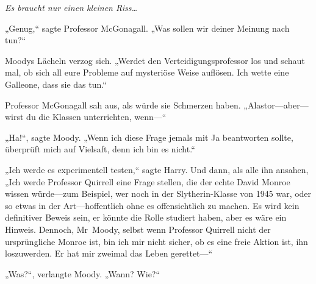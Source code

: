 \emph{Es braucht nur einen kleinen Riss…}

„Genug,“ sagte Professor McGonagall. „Was sollen wir deiner Meinung nach tun?“

Moodys Lächeln verzog sich. „Werdet den Verteidigungsprofessor los und schaut mal, ob sich all eure Probleme auf mysteriöse Weise auflösen. Ich wette eine Galleone, dass sie das tun.“

Professor McGonagall sah aus, als würde sie Schmerzen haben.
„Alastor—aber—wirst du die Klassen unterrichten, wenn—“

„Ha!“, sagte Moody. „Wenn ich diese Frage jemals mit Ja beantworten sollte, überprüft mich auf Vielsaft, denn ich bin es nicht.“

„Ich werde es experimentell testen,“ sagte Harry. Und dann, als alle ihn ansahen, „Ich werde Professor Quirrell eine Frage stellen, die der echte David Monroe wissen würde—zum Beispiel, wer noch in der Slytherin-Klasse von 1945 war, oder so etwas in der Art—hoffentlich ohne es offensichtlich zu machen. Es wird kein definitiver Beweis sein, er könnte die Rolle studiert haben, aber es wäre ein Hinweis. Dennoch, Mr~Moody, selbst wenn Professor Quirrell nicht der ursprüngliche Monroe ist, bin ich mir nicht sicher, ob es eine freie Aktion ist, ihn loszuwerden. Er hat mir zweimal das Leben gerettet—“

„Was?“, verlangte Moody. „Wann? Wie?“

